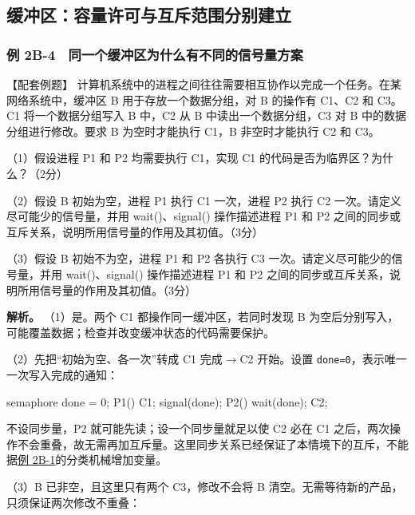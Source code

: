 \subsection{缓冲区：容量许可与互斥范围分别建立}\label{OS02-buffer}

\subsubsection{例 2B-4　同一个缓冲区为什么有不同的信号量方案}\label{OS02-ex-2024}

\begin{example}[配套例题]

【配套例题】 计算机系统中的进程之间往往需要相互协作以完成一个任务。在某网络系统中，缓冲区 B 用于存放一个数据分组，对 B 的操作有 C1、C2 和 C3。C1 将一个数据分组写入 B 中，C2 从 B 中读出一个数据分组，C3 对 B 中的数据分组进行修改。要求 B 为空时才能执行 C1，B 非空时才能执行 C2 和 C3。

（1）假设进程 P1 和 P2 均需要执行 C1，实现 C1 的代码是否为临界区？为什么？（2分）

（2）假设 B 初始为空，进程 P1 执行 C1 一次，进程 P2 执行 C2 一次。请定义尽可能少的信号量，并用 wait()、signal() 操作描述进程 P1 和 P2 之间的同步或互斥关系，说明所用信号量的作用及其初值。（3分）

（3）假设 B 初始不为空，进程 P1 和 P2 各执行 C3 一次。请定义尽可能少的信号量，并用 wait()、signal() 操作描述进程 P1 和 P2 之间的同步或互斥关系，说明所用信号量的作用及其初值。（3分）

\end{example}

\textbf{解析。} （1）是。两个 C1 都操作同一缓冲区，若同时发现 B 为空后分别写入，可能覆盖数据；检查并改变缓冲状态的代码需要保护。

（2）先把``初始为空、各一次''转成 C1 完成\ensuremath{\to}C2 开始。设置 \texttt{done=\allowbreak{}0}，表示唯一一次写入完成的通知：

\begin{codeblock}[language={}]
semaphore done = 0;
P1() { C1; signal(done); }
P2() { wait(done); C2; }
\end{codeblock}

不设同步量，P2 就可能先读；设一个同步量就足以使 C2 必在 C1 之后，两次操作不会重叠，故无需再加互斥量。这里同步关系已经保证了本情境下的互斥，不能据\hyperref[OS02-ex-err11]{例 2B-1}的分类机械增加变量。

（3）B 已非空，且这里只有两个 C3，修改不会将 B 清空。无需等待新的产品，只须保证两次修改不重叠：

